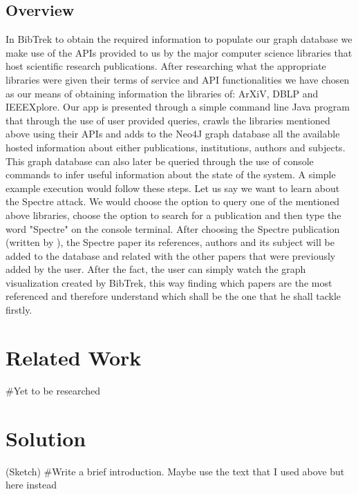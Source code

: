 \documentclass{article}
\begin{document}
\subsection{Overview}
In BibTrek to obtain the required information to populate our graph database we make use of the APIs provided to us by the major computer science libraries that host scientific research publications. After researching what the appropriate libraries were given their terms of service and API functionalities we have chosen as our means of obtaining information the libraries of: ArXiV, DBLP and IEEEXplore. Our app is presented through a simple command line Java program that through the use of user provided queries, crawls the libraries mentioned above using their APIs and adds to the Neo4J graph database all the available hosted information about either publications, institutions, authors and subjects. This graph database can also later be queried through the use of console commands to infer useful information about the state of the system. A simple example execution would follow these steps. Let us say we want to learn about the Spectre attack. We would choose the option to query one of the mentioned above libraries, choose the option to search for a publication and then type the word "Spectre" on the console terminal. After choosing the Spectre publication (written by ), the Spectre paper its references, authors and its subject will be added to the database and related with the other papers that were previously added by the user. After the fact, the user can simply watch the graph visualization created by BibTrek, this way finding which papers are the most referenced and therefore understand which shall be the one that he shall tackle firstly.

\section{Related Work}
#Yet to be researched

\section{Solution}
(Sketch)
#Write a brief introduction. Maybe use the text that I used above but here instead
\end{document}
